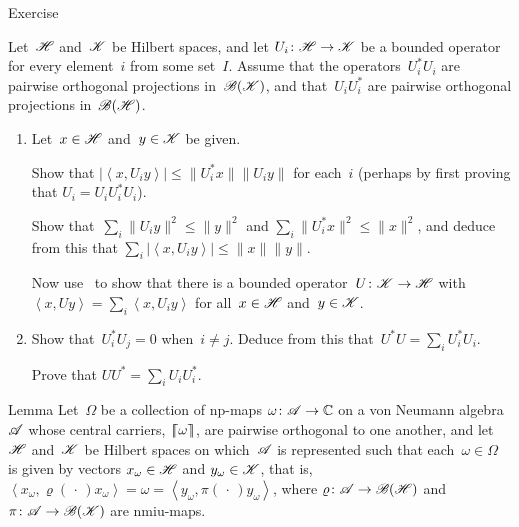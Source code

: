 \documentclass[a]{subfiles}
\begin{document}
\begin{parsec}
\begin{point}{Exercise}
\begin{point}%
Let~$\mathscr{H}$ and~$\mathscr{K}$ be Hilbert spaces,
and 
let $U_i\colon \mathscr{H}\to\mathscr{K}$
be a bounded operator
for every element~$i$ from some set~$I$.
Assume that the operators~$U_i^*U_i$
are pairwise orthogonal projections in~$\mathscr{B}(\mathscr{K})$,
and that~$U_iU_i^*$ are pairwise orthogonal projections in~$\mathscr{B}(\mathscr{H})$.
\begin{enumerate}
\item
Let~$x\in\mathscr{H}$ and~$y\in\mathscr{K}$ be given.

Show that
$\left|\left<x,U_iy\right>\right|
\leq \|U_i^*x\| \|U_i y \|$
for each~$i$
(perhaps by first proving that  $U_i = U_i U_i^* U_i$).

Show that~$\sum_i \|U_i y\|^2 \leq \|y\|^2$
and $\sum_i \|U_i^* x\|^2\leq \|x\|^2$,
and deduce from this
that $\sum_i \left|\left<x,U_i y\right>\right| \leq \|x\|\|y\|$.

Now use~
to show that there is a bounded operator~$U\colon \mathscr{K}\to\mathscr{H}$
with $\left<x,Uy\right>
= \sum_i \left<x,U_iy\right>$
for all~$x\in\mathscr{H}$ and~$y\in \mathscr{K}$.
\item
Show that~$U_i^*U_j = 0$ when~$i\neq j$.
Deduce from this that~$U^*U = \sum_i U_i^* U_i$.

Prove that $UU^* = \sum_i U_iU_i^*$.
\end{enumerate}
\end{point}
\end{point}
\begin{point}{Lemma}%
Let~$\Omega$ be a collection of np-maps $\omega\colon \mathscr{A}\to\mathbb{C}$
on a von Neumann algebra~$\mathscr{A}$ 
whose central carriers,  $\left\lceil\!\!\left\lceil\omega\right\rceil\!\!\right\rceil$, are pairwise orthogonal to one another,
and let~$\mathscr{H}$ and~$\mathscr{K}$ be Hilbert spaces
on which~$\mathscr{A}$ is represented such
that each~$\omega\in\Omega$ 
is given by vectors $x_\omega\in\mathscr{H}$ and $y_\omega\in\mathscr{K}$,
that is,
$\left<x_\omega,\varrho(\,\cdot\,)x_\omega\right>
=\omega = \left<y_\omega,\pi(\,\cdot\,)y_\omega\right>$,
where $\varrho\colon \mathscr{A}\to\mathscr{B}(\mathscr{H})$
and $\pi\colon \mathscr{A}\to\mathscr{B}(\mathscr{K})$
are nmiu-maps.


\end{point}
\end{parsec}
\end{document}
